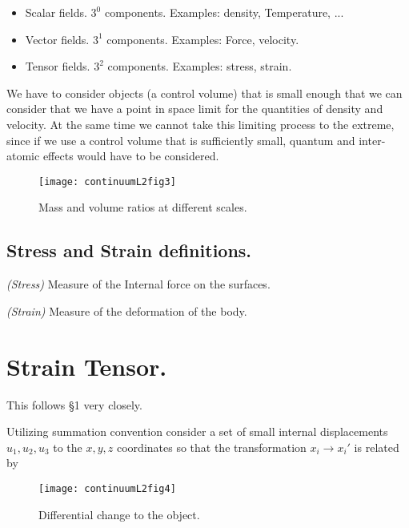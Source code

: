 \begin{itemize}
\item Scalar fields.  $3^0$ components.  Examples: density, Temperature, ...
\item Vector fields.  $3^1$ components.  Examples: Force, velocity.
\item Tensor fields.  $3^2$ components.  Examples: stress, strain.
\end{itemize}

We have to consider objects (a control volume) that is small enough that we can consider that we have a point in space limit for the quantities of density and velocity.  At the same time we cannot take this limiting process to the extreme, since if we use a control volume that is sufficiently small, quantum and inter-atomic effects would have to be considered.

\begin{figure}[htp]
   \centering
   \texttt{[image: continuumL2fig3]}
   \caption{Mass and volume ratios at different scales.}\label{fig:continuumL2:continuumL2fig3}
\end{figure}

\subsection{Stress and Strain definitions.}

\begin{definition}
\emph{(Stress)}
\label{dfn:continuumL2:10}
Measure of the Internal force on the surfaces.
\end{definition}

\begin{definition}
\emph{(Strain)}
\label{dfn:continuumL2:30}
Measure of the deformation of the body.
\end{definition}

\section{Strain Tensor.}

This follows \cite{landau1960theory} \S 1 very closely.

Utilizing summation convention consider a set of small internal displacements $u_1, u_2, u_3$ to the $x, y, z$ coordinates so that the transformation $x_i \rightarrow x_i'$ is related by

\begin{figure}[htp]
   \centering
   \texttt{[image: continuumL2fig4]}
   \caption{Differential change to the object.}\label{fig:continuumL2:continuumL2fig4}
\end{figure}

